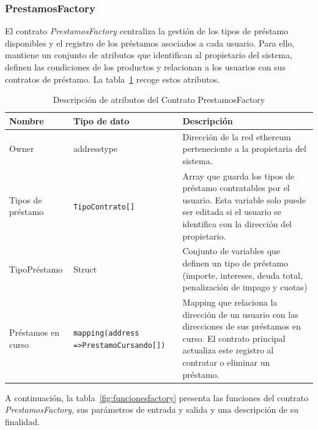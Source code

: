 \subsubsection{PrestamosFactory }
El contrato \textit{PrestamosFactory} centraliza la gestión de los tipos de
préstamo disponibles y el registro de los préstamos asociados a cada usuario. 
Para ello, mantiene un conjunto de atributos que identifican al propietario del 
sistema, definen las condiciones de los productos y 
relacionan a los usuarios con sus contratos de préstamo. 
La tabla~\ref{fig:atributosfactory} recoge estos atributos.
    \begin{table}[H]
    \centering
    \caption{Descripción de atributos del Contrato PrestamosFactory}
        \label{fig:atributosfactory}
    \small
    \begin{tabular}{|p{3cm}|p{4.1cm}|p{6.1cm}|}
        \hline
        \rowcolor[HTML]{D0E7FF}
        Nombre & Tipo de dato & Descripción\\ \hline
        Owner&\gls{addresstype}&Dirección de la red \gls{ethereum} perteneciente a la 
        propietaria del sistema.\\ \hline
        Tipos de préstamo&\texttt{TipoContrato[]}&Array que guarda los tipos de préstamo contratables por el usuario. \newline
    Esta variable solo puede ser editada si el usuario se identifica con la dirección del propietario.\\ \hline
    TipoPréstamo&Struct&Conjunto de variables que definen un tipo de préstamo (importe, intereses, deuda total, penalización de impago y  cuotas)\\ \hline
    Préstamos en curso&\texttt{mapping(address =>}\newline\texttt{Prestamo\allowbreak{}Cursando[])}&Mapping que relaciona la dirección de un
    usuario con las direcciones de sus
    préstamos en curso. \newline
    El contrato principal actualiza este registro al contratar o eliminar un préstamo.\\ \hline
    \end{tabular}
    \end{table}


A continuación, la tabla~\ref{fig:funcionesfactory} presenta las funciones del contrato
\textit{PrestamosFactory}, sus parámetros de entrada y salida y una
descripción de su finalidad.

